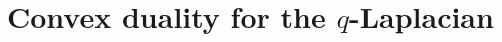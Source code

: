 \documentclass[reqno,11pt]{amsart}
\newcommand*\dif{\mathop{}\!\mathrm{d}}
\newcommand{\cpt}{\mathrm{cpt}}
\newtheorem{corollary}[theorem]{Corollary}
\theoremstyle{definition}
\numberwithin{equation}{section}
\begin{document}



\section{Convex duality for the \texorpdfstring{$q$-Laplacian}{q-Laplacian}}
\end{document}
